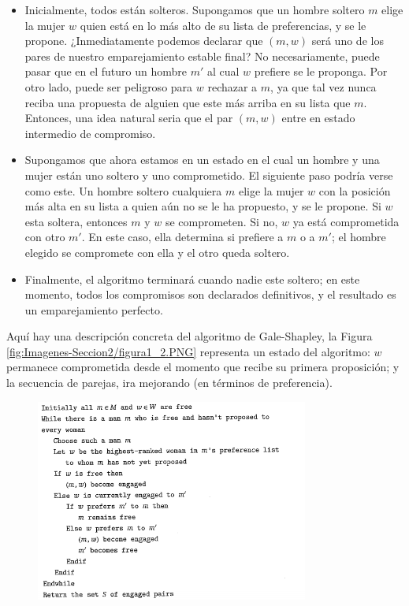 \documentclass[a4paper, 12pt]{book}
\begin{document}
\begin{itemize}
    \item Inicialmente, todos están solteros. Supongamos que un hombre soltero $m$ elige la mujer $w$ quien está en lo más alto de su lista de preferencias, y se le propone. ¿Inmediatamente podemos declarar que $(m,w)$ será uno de los pares de nuestro emparejamiento estable final? No necesariamente, puede pasar que en el futuro un hombre $m'$ al cual $w$ prefiere se le proponga. Por otro lado, puede ser peligroso para $w$ rechazar a $m$, ya que tal vez nunca reciba una propuesta de alguien que este más arriba en su lista que $m$. Entonces, una idea natural seria que el par $(m,w)$ entre en estado intermedio de compromiso.
    \item Supongamos que ahora estamos en un estado en el cual un hombre y una mujer están uno soltero y uno comprometido. El siguiente paso podría verse como este. Un hombre soltero cualquiera $m$ elige la mujer $w$ con la posición más alta en su lista a quien aún no se le ha propuesto, y se le propone. Si $w$ esta soltera, entonces $m$ y $w$ se comprometen. Si no, $w$ ya está comprometida con otro $m'$. En este caso, ella determina si prefiere a $m$ o a $m'$; el hombre elegido se compromete con ella y el otro queda soltero. 
    \item Finalmente, el algoritmo terminará cuando nadie este soltero; en este momento, todos los compromisos son declarados definitivos, y el resultado es un emparejamiento perfecto. 
\end{itemize}
    
Aquí hay una descripción concreta del algoritmo de Gale-Shapley, la Figura \ref{fig:Imagenes-Seccion2/figura1_2.PNG} representa un estado del algoritmo: $w$ permanece comprometida desde el momento que recibe su primera proposición; y la secuencia de parejas, ira mejorando (en términos de preferencia).

\begin{figure}[h] 
    \centering
    \includegraphics[width=0.8\textwidth]{Imagenes-Seccion2/Imagen1_2.PNG}
\end{figure}
\end{document}
